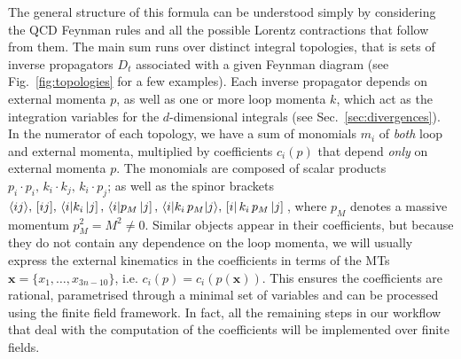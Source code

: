 \documentclass[main.tex]{subfiles}
\begin{document}
The general structure of this formula can be understood simply by considering the QCD Feynman rules and all the possible Lorentz contractions that follow from them. The main sum runs over distinct integral topologies, that is sets of inverse propagators $D_t$ associated with a given Feynman diagram (see Fig.~\ref{fig:topologies} for a few examples). Each inverse propagator depends on external momenta $p$, as well as one or more loop momenta $k$, which act as the integration variables for the $d$-dimensional integrals (see Sec.~\ref{sec:divergences}). In the numerator of each topology, we have a sum of monomials $m_i$ of \textit{both} loop and external momenta, multiplied by coefficients $c_i(p)$ that depend \textit{only} on external momenta $p$. The monomials are composed of scalar products $p_i \cdot p_i,\, k_i \cdot k_j,\, k_i\cdot p_j$; as well as the spinor brackets $\langle ij \rangle,\, [ ij ],\, \langle i |k_i \left| j \right],\, \langle i |p_M \left| j \right],\, \langle i|k_i \, p_M|j \rangle,\, \left[ i \right|k_i \, p_M \left| j \right]\,$, where $p_M$ denotes a massive momentum $p_M^2 = M^2 \neq 0$. Similar objects appear in their coefficients, but because they do not contain any dependence on the loop momenta, we will usually express the external kinematics in the coefficients in terms of the MTs $\mathbf{x} = \{x_1, \ldots, x_{3n-10}\}$, i.e. $c_i(p) = c_i(p(\mathbf{x}))$. This ensures the coefficients are rational, parametrised through a minimal set of variables and can be processed using the finite field framework. In fact, all the remaining steps in our workflow that deal with the computation of the coefficients will be implemented over finite fields. 
\end{document}
